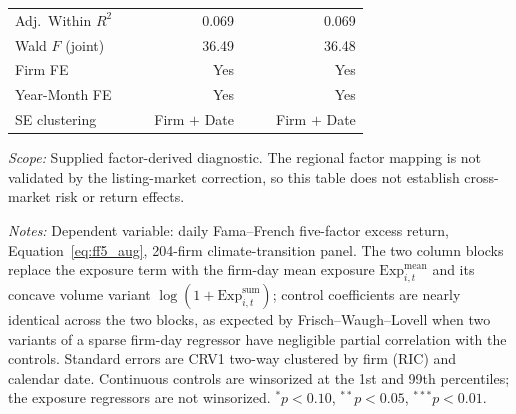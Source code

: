 \begin{table}[htbp]
\begin{threeparttable}
\begin{tabular}{l r r r r r r}
Adj.\ Within $R^2$ & & & 0.069 & & & 0.069 \\
Wald $F$ (joint) & & & 36.49 & & & 36.48 \\
Firm FE & & & Yes & & & Yes \\
Year-Month FE & & & Yes & & & Yes \\
SE clustering & & & Firm $+$ Date & & & Firm $+$ Date \\
\bottomrule
\end{tabular}
\begin{tablenotes}
\small
\item \textit{Scope:} Supplied factor-derived diagnostic. The regional factor mapping is not validated by the listing-market correction, so this table does not establish cross-market risk or return effects.\par
\item \textit{Notes:} Dependent variable: daily Fama--French five-factor excess return, Equation~\ref{eq:ff5_aug}, 204-firm climate-transition panel. The two column blocks replace the exposure
term with the firm-day mean exposure $\mathrm{Exp}^{\text{mean}}_{i,t}$ and its
concave volume variant $\log(1+\mathrm{Exp}^{\text{sum}}_{i,t})$; control
coefficients are nearly identical across the two blocks, as expected by
Frisch--Waugh--Lovell when two variants of a sparse firm-day regressor have
negligible partial correlation with the controls. Standard errors are CRV1
two-way clustered by firm (RIC) and calendar date. Continuous controls are
winsorized at the 1st and 99th percentiles; the exposure regressors are not
winsorized. $^{*}p<0.10$, $^{**}p<0.05$, $^{***}p<0.01$.
\end{tablenotes}
\end{threeparttable}
\end{table}
